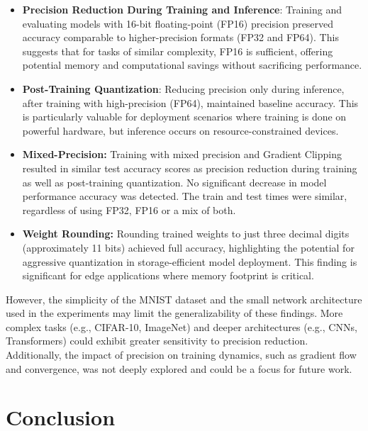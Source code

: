 \documentclass[11pt]{article}
\begin{document}
\begin{itemize}
	\item \textbf{Precision Reduction During Training and Inference}: Training and
	      evaluating models with 16-bit floating-point (FP16) precision preserved accuracy
	      comparable to higher-precision formats (FP32 and FP64). This suggests that for
	      tasks of similar complexity, FP16 is sufficient, offering potential memory and
	      computational savings without sacrificing performance.

	\item \textbf{Post-Training Quantization}: Reducing precision only during inference, after
	      training with high-precision (FP64), maintained baseline accuracy. This is
	      particularly valuable for deployment scenarios where training is done on powerful
	      hardware, but inference occurs on resource-constrained devices.

	\item \textbf{Mixed-Precision:} Training with mixed precision and Gradient Clipping
		  resulted in similar test accuracy scores as precision reduction during training
		  as well as post-training quantization. No significant decrease in model
		  performance accuracy was detected. The train and test times were similar,
		  regardless of using FP32, FP16 or a mix of both.

	\item \textbf{Weight Rounding:} Rounding trained weights to just three decimal digits
	      (approximately 11 bits) achieved full accuracy, highlighting the potential for
	      aggressive quantization in storage-efficient model deployment. This finding is
	      significant for edge applications where memory footprint is critical.
\end{itemize}

However, the simplicity of the MNIST dataset and the small network architecture
used in the experiments may limit the generalizability of these findings. More
complex tasks (e.g., CIFAR-10, ImageNet) and deeper architectures (e.g., CNNs,
Transformers) could exhibit greater sensitivity to precision reduction.
Additionally, the impact of precision on training dynamics, such as gradient
flow and convergence, was not deeply explored and could be a focus for future
work.

\section{Conclusion}
\end{document}
